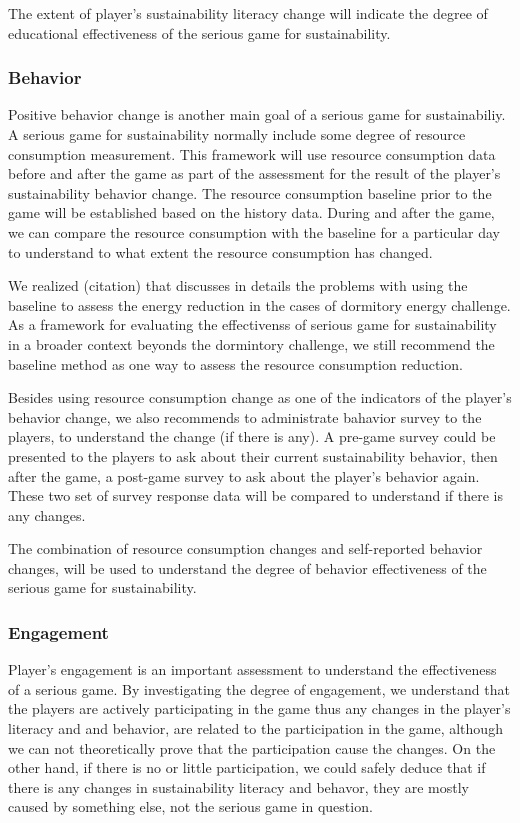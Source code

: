 The extent of player's sustainability literacy change will indicate the degree of educational effectiveness of the serious game for sustainability.

\subsubsection{Behavior}

Positive behavior change is another main goal of a serious game for sustainabiliy. A serious game for sustainability normally include some degree of resource consumption measurement. This framework will use resource consumption data before and after the game as part of the assessment for the result of the player's sustainability behavior change.  The resource consumption baseline prior to the game will be established based on the history data. During and after the game, we can compare the resource consumption with the baseline for a particular day to understand to what extent the resource consumption has changed.

We realized (citation) that discusses in details the problems with using the baseline to assess the energy reduction in the cases of dormitory energy challenge. As a framework for evaluating the effectivenss of serious game for sustainability in a broader context beyonds the dormintory challenge, we still recommend the baseline method as one way to assess the resource consumption reduction.

Besides using resource consumption change as one of the indicators of the player's behavior change, we also recommends to administrate bahavior survey to the players, to understand the change (if there is any). A pre-game survey could be presented to the players to ask about their current sustainability behavior, then after the game, a post-game survey to ask about the player's behavior again. These two set of survey response data will be compared to understand if there is any changes.

The combination of resource consumption changes and self-reported behavior changes, will be used to understand the degree of behavior effectiveness of the serious game for sustainability.

\subsubsection{Engagement}

Player's engagement is an important assessment to understand the effectiveness of a serious game. By investigating the degree of engagement, we understand that the players are actively participating in the game thus any changes in the player's literacy and and behavior, are related to the participation in the game, although we can not theoretically prove that the participation cause the changes. On the other hand, if there is no or little participation, we could safely deduce that if there is any changes in sustainability literacy and behavor, they are mostly caused by something else, not the serious game in question.

